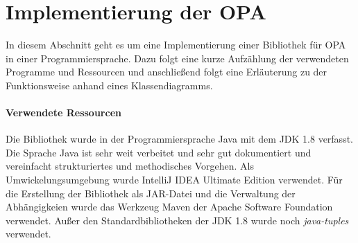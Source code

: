 \section{Implementierung der OPA}
In diesem Abschnitt geht es um eine Implementierung einer Bibliothek für OPA in einer Programmiersprache. Dazu folgt eine kurze Aufzählung der verwendeten Programme und Ressourcen und anschließend folgt eine Erläuterung zu der Funktionsweise anhand eines Klassendiagramms.
\paragraph*{Verwendete Ressourcen}
Die Bibliothek wurde in der Programmiersprache Java mit dem JDK 1.8 verfasst. Die Sprache Java ist sehr weit verbeitet und sehr gut dokumentiert und vereinfacht strukturiertes und methodisches Vorgehen. Als Umwickelungsumgebung wurde IntelliJ IDEA Ultimate Edition verwendet. Für die Erstellung der Bibliothek  als JAR-Datei und die Verwaltung der Abhängigkeien wurde das Werkzeug Maven der Apache Software Foundation verwendet. Außer den Standardbibliotheken der JDK 1.8 wurde noch \textit{java-tuples} verwendet.

